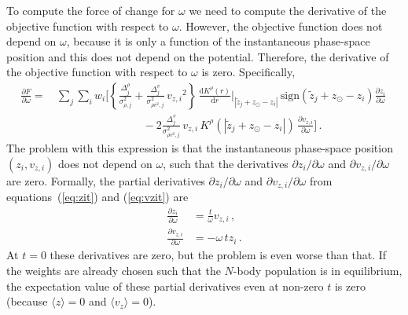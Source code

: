 \documentclass[12pt,preprint]{aastex}
\newcommand{\dd}{\mathrm{d}}
\newcommand{\eqnname}{equation}
\newcommand{\equationname}{\eqnname}
\newcommand{\zsun}{\ensuremath{z_\odot}}
\newcommand{\vz}{\ensuremath{v_z}}
\newcommand{\vzi}{\ensuremath{v_{z,i}}}
\newcommand{\zi}{\ensuremath{z_i}}
\newcommand{\wi}{\ensuremath{w_i}}
\newcommand{\zobs}{\ensuremath{\tilde{z}}}
\begin{document}
To compute the force of change for $\omega$ we need to compute the
derivative of the objective function with respect to
$\omega$. However, the objective function does not depend on $\omega$,
because it is only a function of the instantaneous phase-space
position and this does not depend on the potential. Therefore, the
derivative of the objective function with respect to $\omega$ is
zero. Specifically,
\begin{equation}\label{eq:fcomega}
\begin{split}
  \frac{\partial F}{\partial \omega} = & \,\sum_j \sum_i \wi \Bigg[\left\{\frac{\Delta^\rho_j}{\sigma_{\rho,j}^2}+\frac{\Delta^v_j}{\sigma_{\rho v^2,j}^2}\,\vzi^2\right\}\,\frac{\dd K^\rho(r)}{\dd r}\Bigg|_{|\zobs_j+\zsun-\zi|}\,\mathrm{sign}(\zobs_j+\zsun-\zi)\frac{\partial \zi}{\partial \omega}\,\\
  & \qquad \qquad \qquad \qquad -2\frac{\Delta^v_j}{\sigma_{\rho v^2,j}^2} \,\vzi\,K^\rho(|\zobs_j+\zsun-\zi|)\,\frac{\partial \vzi}{\partial \omega}\Bigg]\,.
\end{split}
\end{equation}
The problem with this expression is that the instantaneous phase-space
position $(\zi,\vzi)$ does not depend on $\omega$, such that the
derivatives $\partial \zi / \partial \omega$ and $\partial \vzi /
\partial \omega$ are zero. Formally, the partial derivatives $\partial
\zi / \partial \omega$ and $\partial \vzi / \partial \omega$ from
\equationname s~(\ref{eq:zit}) and (\ref{eq:vzit}) are
\begin{align}
  \frac{\partial \zi}{\partial \omega} & = \frac{t}{\omega} \vzi\,,\\
  \frac{\partial \vzi}{\partial \omega} & = -\omega\,t \zi\,.
\end{align}
At $t=0$ these derivatives are zero, but the problem is even worse
than that. If the weights are already chosen such that the $N$-body
population is in equilibrium, the expectation value of these partial
derivatives even at non-zero $t$ is zero (because $\langle z \rangle =
0$ and $\langle \vz \rangle = 0$).
\end{document}
